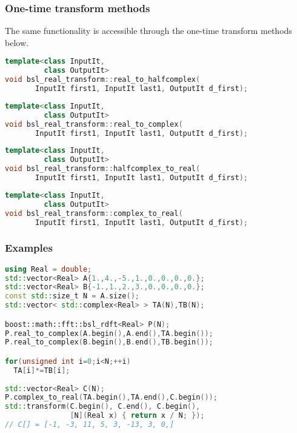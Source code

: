\subsubsection*{One-time transform methods}
The same functionality is accessible through the one-time transform methods
below.

\begin{lstlisting}[language=C++,caption=One-time transform real to halfcomplex.]
template<class InputIt,
         class OutputIt>
void bsl_real_transform::real_to_halfcomplex(
       InputIt first1, InputIt last1, OutputIt d_first);
\end{lstlisting}
\begin{lstlisting}[language=C++,caption=One-time transform real to complex.]
template<class InputIt,
         class OutputIt>
void bsl_real_transform::real_to_complex(
       InputIt first1, InputIt last1, OutputIt d_first);
\end{lstlisting}
\begin{lstlisting}[language=C++,caption=One-time transform halfcomplex to real.]
template<class InputIt,
         class OutputIt>
void bsl_real_transform::halfcomplex_to_real(
       InputIt first1, InputIt last1, OutputIt d_first);
\end{lstlisting}
\begin{lstlisting}[language=C++,caption=One-time transform complex to real.]
template<class InputIt,
         class OutputIt>
void bsl_real_transform::complex_to_real(
       InputIt first1, InputIt last1, OutputIt d_first);
\end{lstlisting}

\subsubsection*{Examples}
\begin{lstlisting}[language=C++,caption=Polynomial multiplication.]
using Real = double;
std::vector<Real> A{1.,4.,-5.,1.,0.,0.,0.,0.};
std::vector<Real> B{-1.,1.,2.,3.,0.,0.,0.,0.};
const std::size_t N = A.size();
std::vector< std::complex<Real> > TA(N),TB(N);

boost::math::fft::bsl_rdft<Real> P(N); 
P.real_to_complex(A.begin(),A.end(),TA.begin());
P.real_to_complex(B.begin(),B.end(),TB.begin());

for(unsigned int i=0;i<N;++i)
  TA[i]*=TB[i];
  
std::vector<Real> C(N);
P.complex_to_real(TA.begin(),TA.end(),C.begin());
std::transform(C.begin(), C.end(), C.begin(),
               [N](Real x) { return x / N; });
// C[] = [-1, -3, 11, 5, 3, -13, 3, 0,]
\end{lstlisting}

